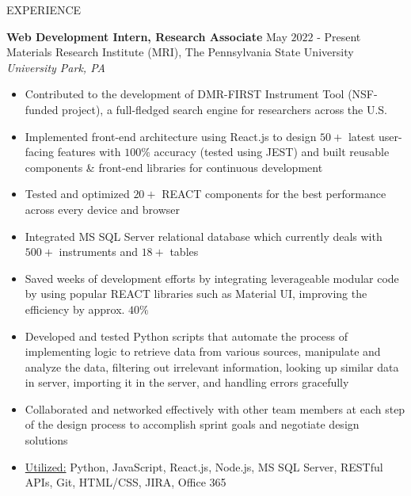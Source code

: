 \documentclass{resume} %
\begin{document}
\begin{rSection}{EXPERIENCE}

\textbf{Web Development Intern, Research Associate} \hfill May $2022$ - Present\\
Materials Research Institute (MRI), The Pennsylvania State University \hfill \textit{University Park, PA}
 \begin{itemize}
    \itemsep -3pt {}
     \item Contributed to the development of DMR-FIRST Instrument Tool (NSF-funded project), a full-fledged search engine for researchers across the U.S.
     \item Implemented front-end architecture using React.js to design $50+$ latest user-facing features with $100\%$ accuracy (tested using JEST) and built reusable components \& front-end libraries for continuous development
     \item Tested and optimized $20+$ REACT components for the best performance across every device and browser
     \item Integrated MS SQL Server relational database which currently deals with $500+$ instruments and $18+$ tables
     \item Saved weeks of development efforts by integrating leverageable modular code by using popular REACT libraries such as Material UI, improving the efficiency by approx. $40\%$
     \item Developed and tested Python scripts that automate the process of implementing logic to retrieve data from various sources, manipulate and analyze the data, filtering out irrelevant information, looking up similar data in server, importing it in the server, and handling errors gracefully
     \item Collaborated and networked effectively with other team members at each step of the design process to accomplish sprint goals and negotiate design solutions 
     \item \underline{Utilized:} Python, JavaScript, React.js, Node.js, MS SQL Server, RESTful APIs, Git, HTML/CSS, JIRA, Office 365
    \end{itemize}

\end{rSection} 


\end{document}
